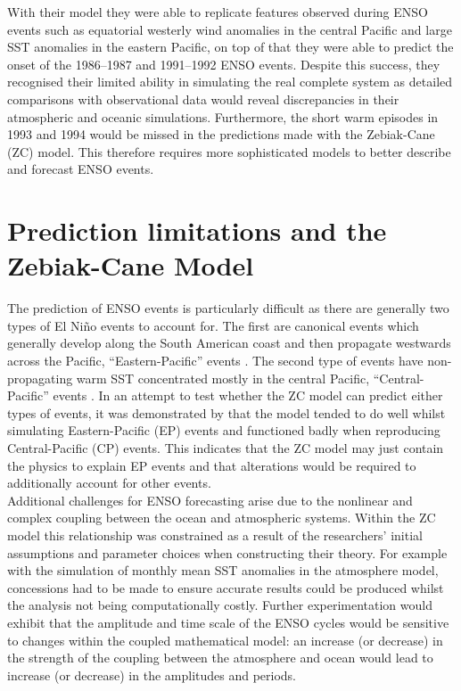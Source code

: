 \documentclass[12pt, onecolumn]{revtex4}    %
\begin{document}
With their model they were able to replicate features observed during ENSO events such as equatorial westerly wind anomalies in the central Pacific and large SST anomalies in the eastern Pacific, on top of that they were able to predict the onset of the 1986--1987 and 1991--1992 ENSO events. Despite this success, they recognised their limited ability in simulating the real complete system as detailed comparisons with observational data would reveal discrepancies in their atmospheric and oceanic simulations. Furthermore, the short warm episodes in 1993 and 1994 would be missed in the predictions made with the Zebiak-Cane (ZC) model. This therefore requires more sophisticated models to better describe and forecast ENSO events.

\section{Prediction limitations and the Zebiak-Cane Model}

The prediction of ENSO events is particularly difficult as there are generally two types of El Ni\~{n}o events to account for. The first are canonical events which generally develop along the South American coast and then propagate westwards across the Pacific, ``Eastern-Pacific'' events \citep{rasmusson1982variations}. The second type of events have non-propagating warm SST concentrated mostly in the central Pacific, ``Central-Pacific'' events \citep{ashok2007nino}. In an attempt to test whether the ZC model can predict either types of events, it was demonstrated by \cite{duan2013behaviors} that the model tended to do well whilst simulating Eastern-Pacific (EP) events and functioned badly when reproducing Central-Pacific (CP) events. This indicates that the ZC model may just contain the physics to explain EP events and that alterations would be required to additionally account for other events. \\

Additional challenges for ENSO forecasting arise due to the nonlinear and complex coupling between the ocean and atmospheric systems. Within the ZC model this relationship was constrained as a result of the researchers' initial assumptions and parameter choices when constructing their theory. For example with the simulation of monthly mean SST anomalies in the atmosphere model, concessions had to be made to ensure accurate results could be produced whilst the analysis not being computationally costly. Further experimentation would exhibit that the amplitude and time scale of the ENSO cycles would be sensitive to changes within the coupled mathematical model: an increase (or decrease) in the strength of the coupling between the atmosphere and ocean would lead to increase (or decrease) in the amplitudes and periods. \\
\end{document}
